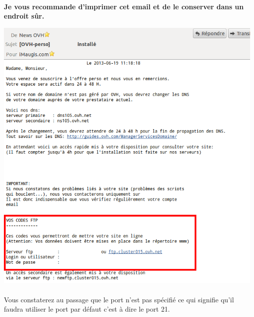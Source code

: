 \documentclass[10pt,a4paper]{article}
\begin{document}
\paragraph{}\begin{center}\textbf{Je vous recommande d'imprimer cet email et de le conserver dans un endroit sûr.}\end{center}
\begin{center}
\includegraphics[scale=0.4]{img/0289.png}
\end{center}
\paragraph{}Vous constaterez au passage que le port n'est pas spécifié ce qui signifie qu'il faudra utiliser le port par défaut c'est à dire le port 21.
\newpage
\end{document}
